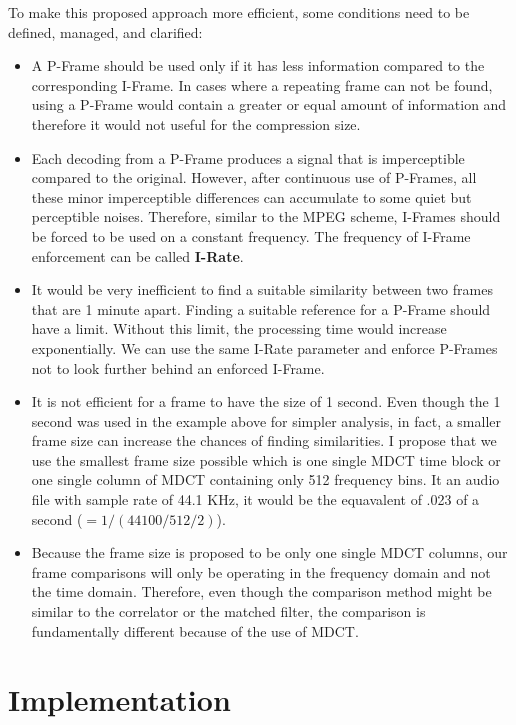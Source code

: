To make this proposed approach more efficient, some conditions need to be defined, managed, and clarified:
\begin{itemize}
    \item A P-Frame should be used only if it has less information compared to the corresponding I-Frame. In cases where a repeating frame can not be found, using a P-Frame would contain a greater or equal amount of information and therefore it would not useful for the compression size. 
    \item Each decoding from a P-Frame produces a signal that is imperceptible compared to the original. However, after continuous use of P-Frames, all these minor imperceptible differences can accumulate to some quiet but perceptible noises. Therefore, similar to the MPEG scheme, I-Frames should be forced to be used on a constant frequency. The frequency of I-Frame enforcement can be called \textbf{I-Rate}. 
    \item It would be very inefficient to find a suitable similarity between two frames that are 1 minute apart. Finding a suitable reference for a P-Frame should have a limit. Without this limit, the processing time would increase exponentially. We can use the same I-Rate parameter and enforce P-Frames not to look further behind an enforced I-Frame.
    \item It is not efficient for a frame to have the size of 1 second. Even though the 1 second was used in the example above for simpler analysis, in fact, a smaller frame size can increase the chances of finding similarities. I propose that we use the smallest frame size possible which is one single MDCT time block or one single column of MDCT containing only 512 frequency bins. It an audio file with sample rate of 44.1 KHz, it would be the equavalent of .023 of a second ($= 1 / (44100 / 512 / 2)$).
    \item Because the frame size is proposed to be only one single MDCT columns, our frame comparisons will only be operating in the frequency domain and not the time domain. Therefore, even though the comparison method might be similar to the correlator or the matched filter, the comparison is fundamentally different because of the use of MDCT.
\end{itemize}

\section{Implementation}
\label{sec:implementation}

